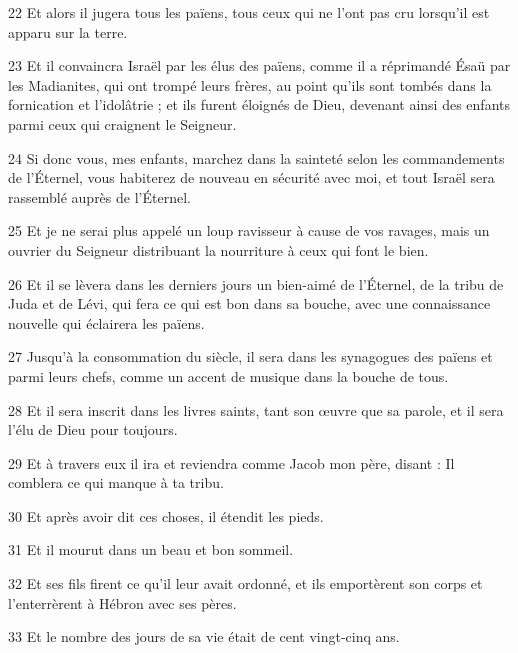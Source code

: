 \par 22 Et alors il jugera tous les païens, tous ceux qui ne l'ont pas cru lorsqu'il est apparu sur la terre.

\par 23 Et il convaincra Israël par les élus des païens, comme il a réprimandé Ésaü par les Madianites, qui ont trompé leurs frères, au point qu'ils sont tombés dans la fornication et l'idolâtrie ; et ils furent éloignés de Dieu, devenant ainsi des enfants parmi ceux qui craignent le Seigneur.

\par 24 Si donc vous, mes enfants, marchez dans la sainteté selon les commandements de l'Éternel, vous habiterez de nouveau en sécurité avec moi, et tout Israël sera rassemblé auprès de l'Éternel.

\par 25 Et je ne serai plus appelé un loup ravisseur à cause de vos ravages, mais un ouvrier du Seigneur distribuant la nourriture à ceux qui font le bien.

\par 26 Et il se lèvera dans les derniers jours un bien-aimé de l'Éternel, de la tribu de Juda et de Lévi, qui fera ce qui est bon dans sa bouche, avec une connaissance nouvelle qui éclairera les païens.

\par 27 Jusqu'à la consommation du siècle, il sera dans les synagogues des païens et parmi leurs chefs, comme un accent de musique dans la bouche de tous.

\par 28 Et il sera inscrit dans les livres saints, tant son œuvre que sa parole, et il sera l'élu de Dieu pour toujours.

\par 29 Et à travers eux il ira et reviendra comme Jacob mon père, disant : Il comblera ce qui manque à ta tribu.

\par 30 Et après avoir dit ces choses, il étendit les pieds.

\par 31 Et il mourut dans un beau et bon sommeil.

\par 32 Et ses fils firent ce qu'il leur avait ordonné, et ils emportèrent son corps et l'enterrèrent à Hébron avec ses pères.

\par 33 Et le nombre des jours de sa vie était de cent vingt-cinq ans.


